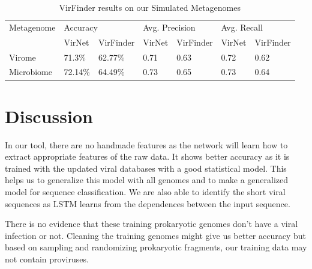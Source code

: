 \documentclass[10pt,journal,compsoc]{IEEEtran}
\begin{document}
\begin{table}[!htbp]
	\centering
	\begin{tabular}{||l l l l l l l||} 
		Metagenome &	\multicolumn{2}{l}{Accuracy} & \multicolumn{2}{l}{Avg. Precision} & \multicolumn{2}{l}{Avg. Recall}\\ [0.5ex] 
		& VirNet & VirFinder & VirNet & VirFinder & VirNet & VirFinder \\
		\hline\hline
		Virome & 71.3\% &	62.77\%	& 0.71 & 0.63 & 0.72 & 0.62 \\
		Microbiome &	72.14\% & 64.49\% &	0.73 & 0.65 & 0.73 & 0.64 \\ [1ex]
	\end{tabular}
	\caption{VirFinder results on our Simulated Metagenomes}
	\label{table:virfinder_results_simulated}
\end{table}


\section{Discussion}

In our tool, there are no handmade features as the network will learn how to extract appropriate features of the raw data. It shows better accuracy as it is trained with the updated viral databases with a good statistical model. This helps us to generalize this model with all genomes and to make a generalized model for sequence classification. We are also able to identify the short viral sequences as LSTM learns from the dependences between the input sequence. 

There is no evidence that these training prokaryotic genomes don't have a viral infection or not. Cleaning the training genomes might give us better accuracy but based on sampling and randomizing prokaryotic fragments, our training data may not contain proviruses. 
\end{document}
